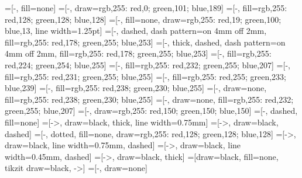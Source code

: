 =[-, fill=none]
=[-, draw={rgb,255: red,0; green,101; blue,189}]
=[-, fill={rgb,255: red,128; green,128; blue,128}]
=[-, fill=none, draw={rgb,255: red,19; green,100; blue,13}, line width=1.25pt]
=[-, dashed, dash pattern=on 4mm off 2mm, fill={rgb,255: red,178; green,255; blue,253}]
=[-, thick, dashed, dash pattern=on 4mm off 2mm, fill={rgb,255: red,178; green,255; blue,253}]
=[-, fill={rgb,255: red,224; green,254; blue,255}]
=[-, fill={rgb,255: red,232; green,255; blue,207}]
=[-, fill={rgb,255: red,231; green,255; blue,255}]
=[-, fill={rgb,255: red,255; green,233; blue,239}]
=[-, fill={rgb,255: red,238; green,230; blue,255}]
=[-, draw=none, fill={rgb,255: red,238; green,230; blue,255}]
=[-, draw=none, fill={rgb,255: red,232; green,255; blue,207}]
=[-, draw={rgb,255: red,150; green,150; blue,150}]
=[-, dashed, fill=none]
=[->, draw=black, thick, line width=0.75mm]
=[->, draw=black, dashed]
=[-, dotted, fill=none, draw={rgb,255: red,128; green,128; blue,128}]
=[->, draw=black, line width=0.75mm, dashed]
=[->, draw=black, line width=0.45mm, dashed]
=[->, draw=black, thick]
=[draw=black, fill=none, tikzit draw=black, ->]
=[-, draw=none]